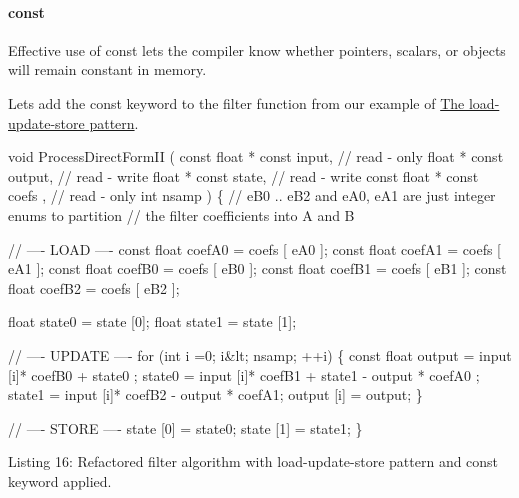 \hypertarget{a00362_subsubsection__const_}{}\paragraph{const}\label{a00362_subsubsection__const_}
 Effective use of {\ttfamily const} lets the compiler know whether pointers, scalars, or objects will remain constant in memory.

Let\textquotesingle{}s add the {\ttfamily const} keyword to the filter function from our example of \hyperlink{a00362_subsection__the_loadupdatestore_pattern}{The load-\/update-\/store pattern}.


\begin{DoxyCode}
\textcolor{keywordtype}{void}
ProcessDirectFormII (
    \textcolor{keyword}{const} \textcolor{keywordtype}{float} * \textcolor{keyword}{const} input, \textcolor{comment}{// read - only}
    \textcolor{keywordtype}{float} * \textcolor{keyword}{const} output, \textcolor{comment}{// read - write}
    \textcolor{keywordtype}{float} * \textcolor{keyword}{const} state, \textcolor{comment}{// read - write}
    \textcolor{keyword}{const} \textcolor{keywordtype}{float} * \textcolor{keyword}{const} coefs , \textcolor{comment}{// read - only}
    \textcolor{keywordtype}{int} nsamp )
\{
    \textcolor{comment}{// eB0 .. eB2 and eA0, eA1 are just integer enums to partition}
    \textcolor{comment}{// the filter coefficients into A and B}

    \textcolor{comment}{// ---- LOAD ----}
    \textcolor{keyword}{const} \textcolor{keywordtype}{float} coefA0 = coefs [ eA0 ];
    \textcolor{keyword}{const} \textcolor{keywordtype}{float} coefA1 = coefs [ eA1 ];
    \textcolor{keyword}{const} \textcolor{keywordtype}{float} coefB0 = coefs [ eB0 ];
    \textcolor{keyword}{const} \textcolor{keywordtype}{float} coefB1 = coefs [ eB1 ];
    \textcolor{keyword}{const} \textcolor{keywordtype}{float} coefB2 = coefs [ eB2 ];

    \textcolor{keywordtype}{float} state0 = state [0];
    \textcolor{keywordtype}{float} state1 = state [1];

    \textcolor{comment}{// ---- UPDATE ----}
    \textcolor{keywordflow}{for} (\textcolor{keywordtype}{int} i =0; i&lt; nsamp; ++i)
    \{
        \textcolor{keyword}{const} \textcolor{keywordtype}{float} output = input [i]* coefB0 + state0 ;
        state0 = input [i]* coefB1 + state1 - output * coefA0 ;
        state1 = input [i]* coefB2 - output * coefA1;
        output [i] = output;
    \}

    \textcolor{comment}{// ---- STORE ----}
    state [0] = state0;
    state [1] = state1;
\} 
\end{DoxyCode}
  Listing 16\+: Refactored filter algorithm with load-\/update-\/store pattern and const keyword applied. 

